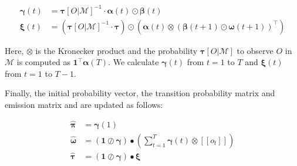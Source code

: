 \begin{align}
    \pmb{\gamma}(t) & = \pmb{\tau}[O | \mathcal{M}]^{-1} \cdot \pmb{\alpha}(t) \odot \pmb{\beta}(t)                                                                                 \\
    \pmb{\xi}(t)    & = (\pmb{\tau}[O | \mathcal{M}]^{-1} \cdot \pmb{\tau}) \odot \left( \pmb{\alpha}(t) \otimes \left(\pmb{\beta}(t+1) \odot \pmb{\omega}(t+1)\right)^\top \right)
\end{align}


Here, $\otimes$ is the Kronecker product and the probability $\pmb{\tau}[O | \mathcal{M}]$ to observe $O$ in $\mathcal{M}$ is computed as $\mathbf{1}^\top \pmb{\alpha}(T)$.
We calculate $\pmb{\gamma}(t)$ from $t= 1$ to $T$ and $\pmb{\xi}(t)$ from $t= 1$ to $T-1$.

Finally, the initial probability vector, the transition probability matrix and emission matrix and are updated as follows:


\begin{align}
    \hat{\pmb{\pi}}    & = \pmb{\gamma}(1)
    \label{eq:initial-probabilities-update}                                                                                          \\
    \hat{\pmb{\omega}} & = ( \mathbf{1} \oslash \pmb{\gamma}) \bullet \left(\sum_{t=1}^{T} \pmb{\gamma}(t) \otimes {[[o_t]]} \right)
    \label{eq:emission-probabilities-update}                                                                                         \\
    \hat{\pmb{\tau}}   & = (\mathbf{1} \oslash \pmb{\gamma} ) \bullet \pmb{\xi}
    \label{eq:transition-probabilities-update}
\end{align}






